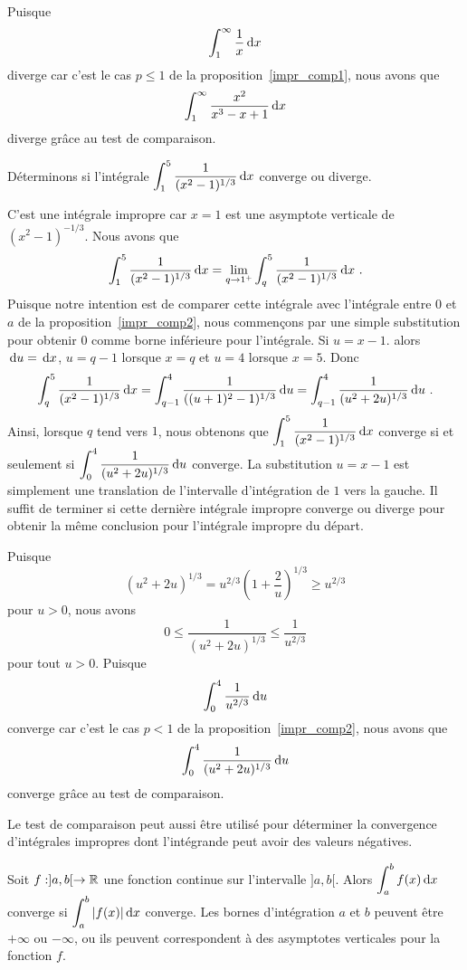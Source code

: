 {\begin{egg}
Puisque
\[
\int_1^\infty \frac{1}{x} \,\mathrm{d}x
\]
diverge car c'est le cas $p \leq 1$ de la proposition~\ref{impr_comp1},
nous avons que
\[
\displaystyle \int_1^\infty \frac{x^2}{x^3-x+1}\,\mathrm{d}x
\]
diverge grâce au test de comparaison.
\label{testCompSin}
\end{egg}

\begin{egg}
Déterminons si l'intégrale
$\displaystyle \int_1^5 \frac{1}{(x^2-1)^{1/3}} \,\mathrm{d}x$
converge ou diverge.

C'est une intégrale impropre car $x=1$ est une asymptote verticale de
$(x^2-1)^{-1/3}$.  Nous avons que
\[
\int_1^5 \frac{1}{(x^2-1)^{1/3}} \,\mathrm{d}x = \lim_{q\to 1^+}
\int_q^5 \frac{1}{(x^2-1)^{1/3}} \,\mathrm{d}x \ .
\]
Puisque notre intention est de comparer cette intégrale avec
l'intégrale entre $0$ et $a$ de la proposition~\ref{impr_comp2}, nous
commençons par une simple substitution pour obtenir $0$ comme borne
inférieure pour l'intégrale.  Si $u=x-1$. alors $\,\mathrm{d}u = \,\mathrm{d}x$,
$u=q-1$ lorsque $x=q$ et $u=4$ lorsque $x=5$.  Donc
\[
\int_q^5 \frac{1}{(x^2-1)^{1/3}} \,\mathrm{d}x
= \int_{q-1}^4 \frac{1}{((u+1)^2-1)^{1/3}} \,\mathrm{d}u
= \int_{q-1}^{4} \frac{1}{(u^2+2u)^{1/3}} \,\mathrm{d}u \ .
\]
Ainsi, lorsque $q$ tend vers $1$, nous obtenons que
$\displaystyle \int_1^5 \frac{1}{(x^2-1)^{1/3}} \,\mathrm{d}x$ converge si et
seulement si $\displaystyle \int_0^{4} \frac{1}{(u^2+2u)^{1/3}} \,\mathrm{d}u$
converge.  La substitution $u=x-1$ est simplement une translation de
l'intervalle d'intégration de $1$ vers la gauche.  Il suffit de
terminer si cette dernière intégrale impropre converge ou diverge pour
obtenir la même conclusion pour l'intégrale impropre du départ.

Puisque
\[
(u^2+2u)^{1/3} = u^{2/3} \left(1+\frac{2}{u}\right)^{1/3} \geq u^{2/3}
\]
pour $u>0$, nous avons
\[
0 \leq \frac{1}{(u^2+2u)^{1/3}} \leq \frac{1}{u^{2/3}}
\]
pour tout $u>0$.  Puisque
\[
\int_0^{4} \frac{1}{u^{2/3}} \,\mathrm{d}u
\]
converge car c'est le cas $p<1$ de la proposition~\ref{impr_comp2}, nous avons
que
\[
\int_0^{4} \frac{1}{(u^2+2u)^{1/3}} \,\mathrm{d}u
\]
converge grâce au test de comparaison.
\end{egg}

Le test de comparaison peut aussi être utilisé pour déterminer la
convergence d'intégrales impropres dont l'intégrande peut avoir des
valeurs négatives.

\begin{theorem} \label{compabsolu}
Soit $f:]a,b[\rightarrow \mathbb{R}$ une fonction continue sur l'intervalle
$]a,b[$.   Alors $\displaystyle \int_a^b f(x) \,\mathrm{d}x$
converge si $\displaystyle \int_a^b |f(x)| \,\mathrm{d}x$ converge.
Les bornes d'intégration $a$ et $b$ peuvent être $+\infty$
ou $-\infty$, ou ils peuvent correspondent à des asymptotes verticales
pour la fonction $f$. 
\end{theorem}

}
